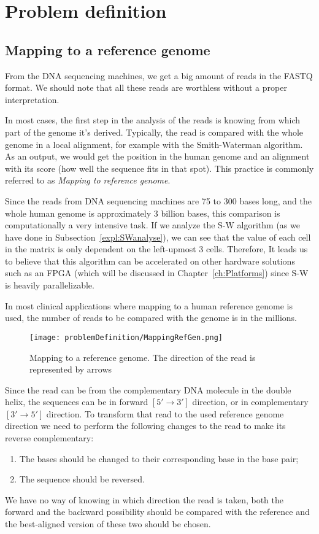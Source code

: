 \section{Problem definition}

\subsection{Mapping to a reference genome}

From the DNA sequencing machines, we get a big amount of reads in the FASTQ format. We should note that all these reads are worthless without a proper interpretation.

In most cases, the first step in the analysis of the reads is knowing from which part of the genome it's derived. Typically, the read is compared with the whole genome in a local alignment, for example with the Smith-Waterman algorithm. As an output, we would get the position in the human genome and an alignment with its score (how well the sequence fits in that spot). This practice is commonly referred to as \emph{Mapping to reference genome}.

Since the reads from DNA sequencing machines are 75 to 300 bases long, and the whole human genome is approximately 3 billion bases, this comparison is computationally a very intensive task. If we analyze the S-W algorithm (as we have done in Subsection~\ref{expl:SWanalyse}), we can see that the value of each cell in the matrix is only dependent on the left-upmost 3 cells. Therefore, It leads us to believe that this algorithm can be accelerated on other hardware solutions such as an FPGA (which will be discussed in Chapter~\ref{ch:Platforms}) since S-W is heavily parallelizable.

In most clinical applications where mapping to a human reference genome is used, the number of reads to be compared with the genome is in the millions.

\begin{figure}[H]
	\centering
	\texttt{[image: problemDefinition/MappingRefGen.png]}
	\caption{Mapping to a reference genome. The direction of the read is represented by arrows}
	\label{fig:mapRefGen}
\end{figure}

Since the read can be from the complementary DNA molecule in the double helix, the sequences can be in forward $[5' \rightarrow 3']$ direction, or in complementary $[3' \rightarrow 5']$ direction. To transform that read to the used reference genome direction we need to perform the following changes to the read to make its reverse complementary:
\begin{enumerate}
	\item The bases should be changed to their corresponding base in the base pair;
	\item The sequence should be reversed.
\end{enumerate}
We have no way of knowing in which direction the read is taken, both the forward and the backward possibility should be compared with the reference and the best-aligned version of these two should be chosen.

